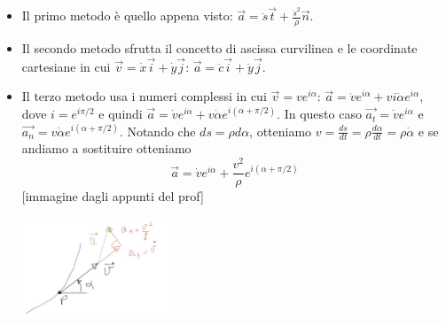 \begin{itemize}
    \item Il primo metodo è quello appena visto: $\vec{a} = \ddot{s} \vec{t} + \frac{\dot{s}^2}{\rho} \vec{n}$.
    \item Il secondo metodo sfrutta il concetto di ascissa curvilinea e le coordinate cartesiane in cui $\vec{v} = \dot{x} \vec{i} + \dot{y} \vec{j}$: $\vec{a} = \ddot{c} \vec{i} + \ddot{y} \vec{j}$.
    \item Il terzo metodo usa i numeri complessi in cui $\vec{v} = v e^{i \alpha}$: $\vec{a} = \dot{v} e^{i \alpha} + v i \dot{\alpha} e^{i \alpha}$, dove $i = e^{i \pi/2}$ e quindi $\vec{a} = \dot{v} e^{i \alpha} + v \dot{\alpha} e^{i(\alpha + \pi/2)}$. In questo caso $\vec{a_t} = \dot{v} e^{i \alpha}$ e $\vec{a_n} = v \dot{\alpha} e^{i(\alpha + \pi/2)}$. Notando che $ds = \rho d \alpha$, otteniamo $v = \frac{ds}{dt} = \rho \frac{d \alpha}{dt} = \rho \dot{\alpha}$ e se andiamo a sostituire otteniamo
    \[
        \vec{a} = \dot{v} e^{i \alpha} + \frac{v^2}{\rho} e^{i(\alpha + \pi/2)}
    \]
    [immagine dagli appunti del prof]
    \begin{center}
        \includegraphics[height=3cm]{../lezione1/img5.JPG}
    \end{center}
\end{itemize}
